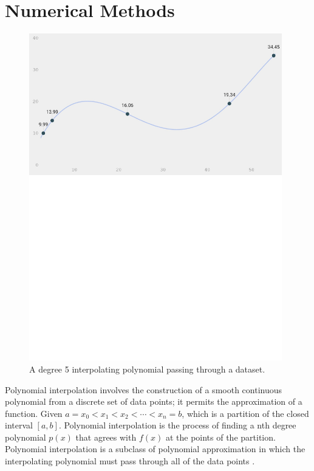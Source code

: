 \documentclass[11pt]{article}%
\begin{document}
\clearpage
\newpage
\section*{Numerical Methods}

\vspace{25pt}
\begin{figure}[htp]

\centering
\vspace{-20pt} %
\includegraphics[width=11cm]{interpolate1}%
\vspace{-220pt}
\caption{A degree 5 interpolating polynomial passing through a dataset.}

\end{figure}

Polynomial interpolation involves the construction of a smooth continuous polynomial from a discrete set of data points; it permits the approximation of a function. Given $a = x_0 < x_1 < x_2 < \cdots < x_n = b$, which is a partition of the closed interval $[a, b]$. Polynomial interpolation is the process of finding a nth degree polynomial $p(x)$ that agrees with $f(x)$ at the points of the partition. Polynomial interpolation is a subclass of polynomial approximation in which the interpolating polynomial must pass through all of the data points \cite{LHK3}.
\end{document}
